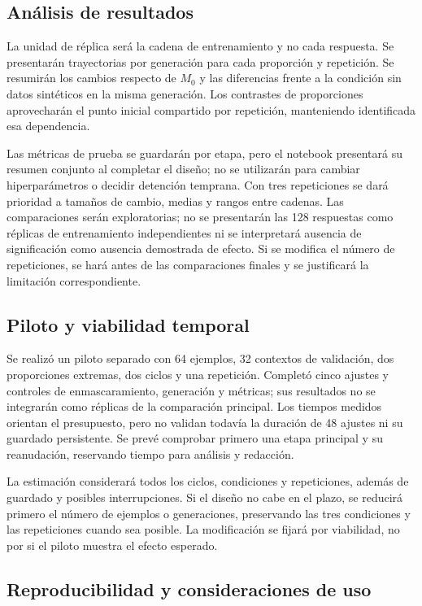\documentclass[12pt,letterpaper]{article}
\begin{document}
\subsection{Análisis de resultados}

La unidad de réplica será la cadena de entrenamiento y no cada respuesta.
Se presentarán trayectorias por generación para cada proporción y
repetición. Se resumirán los cambios respecto de \(M_0\) y las diferencias
frente a la condición sin datos sintéticos en la misma generación.
Los contrastes de proporciones aprovecharán el punto inicial compartido
por repetición, manteniendo identificada esa dependencia.

Las métricas de prueba se guardarán por etapa, pero el notebook presentará
su resumen conjunto al completar el diseño; no se utilizarán para cambiar
hiperparámetros o decidir detención temprana. Con tres repeticiones se dará
prioridad a tamaños de cambio, medias y
rangos entre cadenas. Las comparaciones serán exploratorias; no se
presentarán las 128 respuestas como réplicas de entrenamiento independientes
ni se interpretará ausencia de significación como ausencia demostrada
de efecto. Si se modifica el número de repeticiones, se hará antes de
las comparaciones finales y se justificará la limitación correspondiente.

\subsection{Piloto y viabilidad temporal}

Se realizó un piloto separado con 64 ejemplos, 32 contextos de validación,
dos proporciones extremas, dos ciclos y una repetición. Completó cinco
ajustes y controles de enmascaramiento, generación y métricas; sus
resultados no se integrarán como réplicas de la comparación principal.
Los tiempos medidos orientan el presupuesto, pero no validan todavía la
duración de 48 ajustes ni su guardado persistente. Se prevé comprobar
primero una etapa principal y su reanudación, reservando tiempo para
análisis y redacción.

La estimación considerará todos los ciclos, condiciones y repeticiones,
además de guardado y posibles interrupciones. Si el diseño no cabe en el
plazo, se reducirá primero el número de ejemplos o generaciones, preservando
las tres condiciones y las repeticiones cuando sea posible. La modificación
se fijará por viabilidad, no por si el piloto muestra el efecto esperado.

\subsection{Reproducibilidad y consideraciones de uso}
\end{document}
